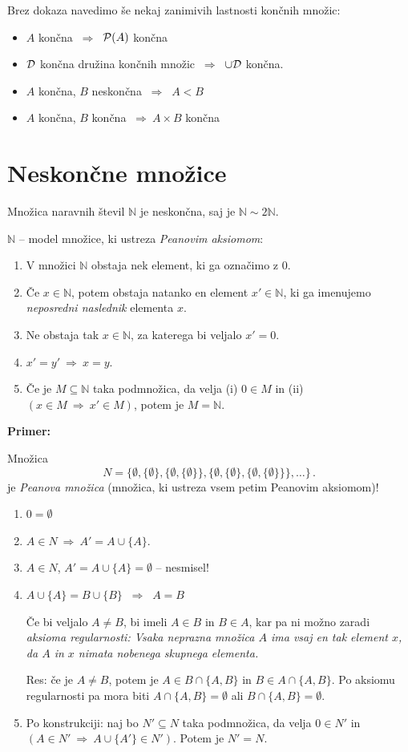 \documentclass[11pt,paper=b5,footinclude,headinclude]{scrbook} %
\def\sledi {{~\Rightarrow~}}
\begin{document}
Brez dokaza navedimo še nekaj zanimivih lastnosti končnih množic:
\begin{itemize}
  \item $A$ končna $\sledi$ ${\cal P}(A)$ končna
  \item ${\cal D}$ končna družina končnih množic $\sledi$ $\cup {\cal D}$ končna.
  \item $A$ končna, $B$ neskončna $\sledi$ $A<B$
  \item $A$ končna, $B$ končna $\sledi A\times B$ končna
\end{itemize}

\section{Neskončne množice}

Množica naravnih števil $\mathbb{N}$ je neskončna, saj je $\mathbb{N}\sim 2\mathbb{N}$.

$\mathbb{N}$  -- model množice, ki ustreza {\em Peanovim aksiomom}:
\begin{enumerate}[1.)]
  \item V množici $\mathbb{N}$ obstaja nek element, ki ga označimo z 0.
  \item Če $x\in \mathbb{N}$, potem obstaja natanko en element $x'\in \mathbb{N}$, ki ga imenujemo {\em neposredni naslednik} elementa $x$.
  \item Ne obstaja tak $x\in \mathbb{N}$, za katerega bi veljalo $x' = 0$.
  \item $x' = y' \sledi x = y$.
  \item Če je $M\subseteq \mathbb{N}$ taka podmnožica, da velja (i) $0\in M$ in (ii) $(x\in M\sledi x'\in M)$, potem je $M = \mathbb{N}$.
\end{enumerate}

\textbf{Primer:}

Množica
$$N = \{\emptyset, \{\emptyset\}, \{\emptyset, \{\emptyset\}\},
\{\emptyset, \{\emptyset\}, \{\emptyset, \{\emptyset\}\}\},\ldots \}\,.$$
je {\em Peanova množica} (množica, ki ustreza vsem petim Peanovim aksiomom)!

\begin{enumerate}
  \item $0 = \emptyset$
  \item $A\in N\sledi A' = A\cup \{A\}$.
  \item $A\in N$, $A' = A\cup \{A\}= \emptyset$ -- nesmisel!
  \item $A\cup \{A\} = B\cup \{B\}$ $\sledi$ $A = B$

  Če bi veljalo $A\neq B$, bi imeli $A\in B$ in $B\in A$, kar pa ni možno zaradi {\em aksioma regularnosti: Vsaka neprazna množica $A$ ima vsaj en tak element $x$, da $A$ in $x$ nimata nobenega skupnega elementa.}

  Res: če je $A\neq B$, potem je $A\in B\cap \{A,B\}$ in $B\in A\cap \{A,B\}$.
  Po aksiomu regularnosti pa mora biti
  $A\cap \{A,B\}= \emptyset$ ali  $B\cap \{A,B\}= \emptyset$.

  \item Po konstrukciji: naj bo $N'\subseteq N$ taka podmnožica, da velja
  $0\in N'$ in $(A\in N'\sledi A\cup \{A'\}\in N')$. Potem je  $N' = N$.
\end{enumerate}
\end{document}
